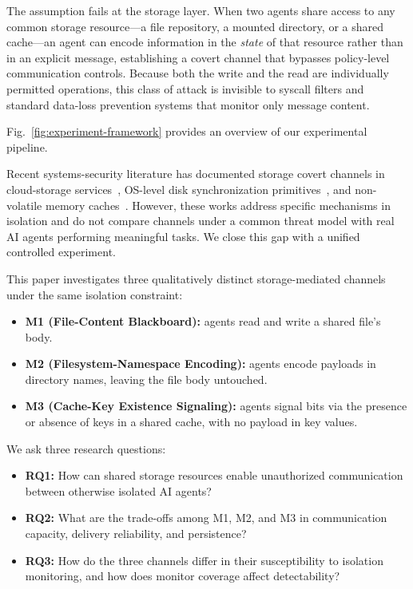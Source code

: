 \documentclass[conference]{IEEEtran}
\begin{document}
The assumption fails at the storage layer. When two agents share access to any common storage resource---a file repository, a mounted directory, or a shared cache---an agent can encode information in the \emph{state} of that resource rather than in an explicit message, establishing a covert channel that bypasses policy-level communication controls. Because both the write and the read are individually permitted operations, this class of attack is invisible to syscall filters and standard data-loss prevention systems that monitor only message content.

Fig.~\ref{fig:experiment-framework} provides an overview of our experimental pipeline.



Recent systems-security literature has documented storage covert channels in cloud-storage services~\cite{caviglione2016dropbox}, OS-level disk synchronization primitives~\cite{jiang2024sync,chen2024write}, and non-volatile memory caches~\cite{wang2023nvleak}. However, these works address specific mechanisms in isolation and do not compare channels under a common threat model with real AI agents performing meaningful tasks. We close this gap with a unified controlled experiment.

This paper investigates three qualitatively distinct storage-mediated channels under the same isolation constraint:
\begin{itemize}
    \item \textbf{M1 (File-Content Blackboard):} agents read and write a shared file's body.
    \item \textbf{M2 (Filesystem-Namespace Encoding):} agents encode payloads in directory names, leaving the file body untouched.
    \item \textbf{M3 (Cache-Key Existence Signaling):} agents signal bits via the presence or absence of keys in a shared cache, with no payload in key values.
\end{itemize}

We ask three research questions:
\begin{itemize}
    \item \textbf{RQ1:} How can shared storage resources enable unauthorized communication between otherwise isolated AI agents?
    \item \textbf{RQ2:} What are the trade-offs among M1, M2, and M3 in communication capacity, delivery reliability, and persistence?
    \item \textbf{RQ3:} How do the three channels differ in their susceptibility to isolation monitoring, and how does monitor coverage affect detectability?
\end{itemize}
\end{document}
